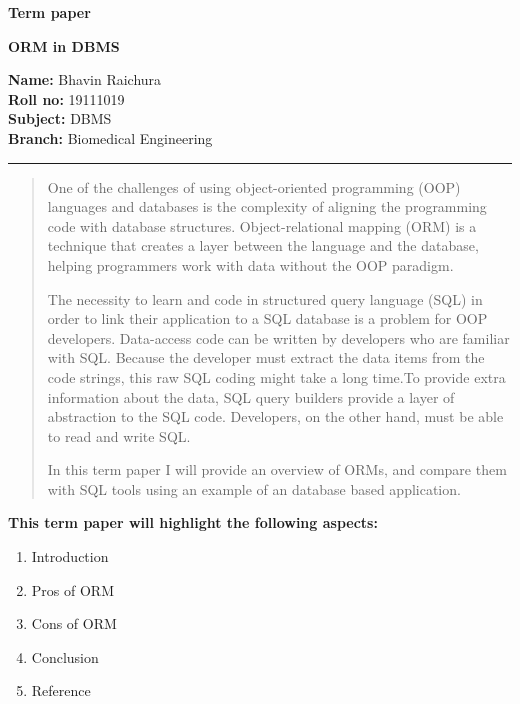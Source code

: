 \documentclass[10pt,a4paper,twoside]{article}
\begin{document}
\begin{center}
\vspace{.3cm}
{\bf {\huge Term paper}}
\item
{\bf {\huge ORM in DBMS}}
\vspace{.3cm}
\end{center}
{\bf Name:}  Bhavin Raichura\\
{\bf Roll no:}  19111019 \\
{\bf Subject:}  DBMS\\
{\bf Branch: }  Biomedical Engineering \hspace{\fill}   \\
\hrule

\vspace{.5cm}
\vspace{.4cm}

\renewcommand{\abstractname}{Abstract}

\begin{abstract}
\item One of the challenges of using object-oriented programming (OOP) languages and databases is the complexity of aligning the programming code with database structures. Object-relational mapping (ORM) is a technique that creates a layer between the language and the database, helping programmers work with data without the OOP paradigm.
\item The necessity to learn and code in structured query language (SQL) in order to link their application to a SQL database is a problem for OOP developers.
Data-access code can be written by developers who are familiar with SQL.
Because the developer must extract the data items from the code strings, this raw SQL coding might take a long time.To provide extra information about the data, SQL query builders provide a layer of abstraction to the SQL code. Developers, on the other hand, must be able to read and write SQL.
\item In this term paper I will provide an overview of ORMs, and compare them with SQL tools using an example of an database based application.
\end{abstract}

\item
\item
{\bf {\Large This term paper will highlight the following aspects: }}\\
\begin{itemize}
\end{itemize}
\item 
\begin{enumerate}
\item Introduction
\item Pros of ORM
\item Cons of ORM
\item Conclusion
\item Reference 
\end{enumerate}
\end{document}
